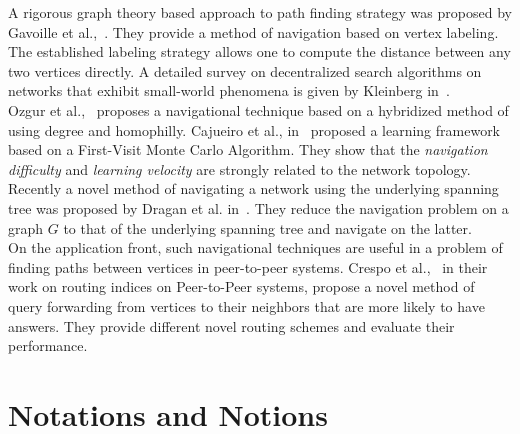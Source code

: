 \documentclass[10pt, conference, compsocconf]{IEEEtran}
\begin{document}
A rigorous graph theory based approach to path finding strategy was proposed 
by Gavoille et al.,~\cite{gavoille04}. They provide a method of navigation based on vertex labeling. The established labeling strategy allows one to compute the distance between any two vertices directly.
A detailed survey on decentralized search algorithms on networks that exhibit small-world phenomena is given by Kleinberg in~\cite{kleinberg06}.\\

Ozgur et al.,~\cite{simsek08} proposes a navigational technique based on a hybridized method of using degree and homophilly. 
Cajueiro et al., in~\cite{cajueiro09} proposed a learning framework based on a First-Visit Monte Carlo Algorithm. They show that the \emph{navigation difficulty} and \emph{learning velocity} are strongly related to the network topology.\\

Recently a novel method of navigating a network using the underlying spanning tree was proposed by Dragan et al. in~\cite{dragan11}. 
They reduce the navigation problem on a graph $G$ to that of the underlying spanning tree and navigate on the latter.\\

On the application front, such navigational techniques are useful in a problem of finding paths between vertices in peer-to-peer systems. Crespo et al.,~\cite{crespo02} in their work on routing indices on Peer-to-Peer systems, propose a novel method of query forwarding from vertices to their neighbors that are more likely to have answers. They provide different novel routing schemes and evaluate their performance.\\

\section{Notations and Notions} 
\label{sec:4_notions}
\end{document}
